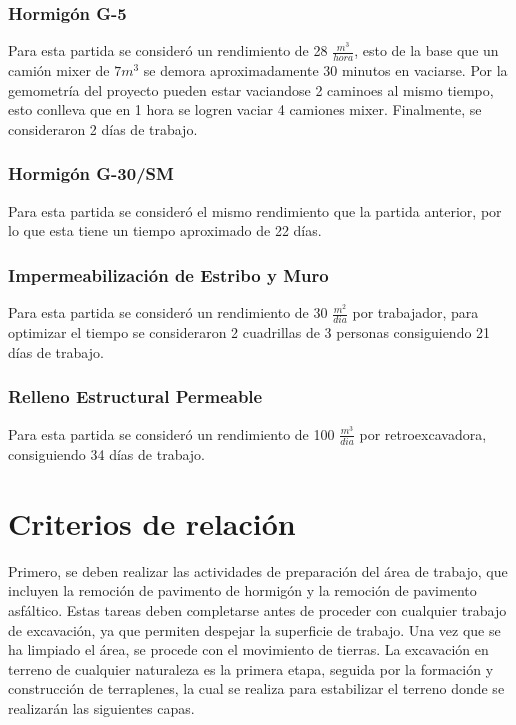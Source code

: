 \documentclass{article} %
\begin{document}
\subsubsection{Hormigón G-5}
Para esta partida se consideró un rendimiento de 28 $\frac{m^3}{hora}$, esto de la base que un camión mixer de $7m^3$ se demora aproximadamente 30 minutos en vaciarse. Por la gemometría del proyecto pueden estar vaciandose 2 caminoes al mismo tiempo, esto conlleva que en 1 hora se logren vaciar 4 camiones mixer. Finalmente, se consideraron 2 días de trabajo.

\subsubsection{Hormigón G-30/SM}
Para esta partida se consideró el mismo rendimiento que la partida anterior, por lo que esta tiene un tiempo aproximado de 22 días.

\subsubsection{Impermeabilización de Estribo y Muro}
Para esta partida se consideró un rendimiento de 30 $\frac{m^2}{dia}$ por trabajador, para optimizar el tiempo se consideraron 2 cuadrillas de 3 personas consiguiendo 21 días de trabajo.

\subsubsection{Relleno Estructural Permeable}
Para esta partida se consideró un rendimiento de 100 $\frac{m^3}{dia}$ por retroexcavadora, consiguiendo 34 días de trabajo.



\newpage
\section{Criterios de relación}

Primero, se deben realizar las actividades de preparación del área de trabajo, que incluyen la remoción de pavimento de hormigón y la remoción de pavimento asfáltico. Estas tareas deben completarse antes de proceder con cualquier trabajo de excavación, ya que permiten despejar la superficie de trabajo. Una vez que se ha limpiado el área, se procede con el movimiento de tierras. La excavación en terreno de cualquier naturaleza es la primera etapa, seguida por la formación y construcción de terraplenes, la cual se realiza para estabilizar el terreno donde se realizarán las siguientes capas.
\end{document}
